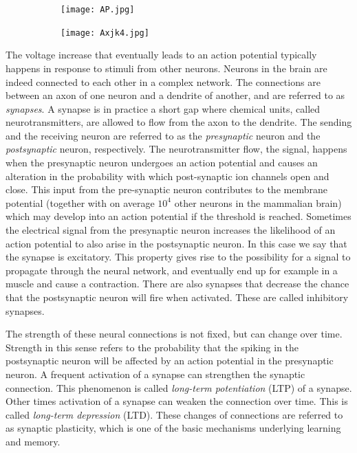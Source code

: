 \begin{figure}[h]
\caption{Graphical representation of an action potential (left). Illustration of action potential propagating along axon (right).}
\label{AP}
\begin{subfigure}
\centering
\texttt{[image: AP.jpg]}
\end{subfigure}
\begin{subfigure}
\centering
\texttt{[image: Axjk4.jpg]}
\end{subfigure}
\end{figure} 

The voltage increase that eventually leads to an action potential typically happens in response to stimuli from other neurons. Neurons in the brain are indeed connected to each other in a complex network. The connections are between an axon of one neuron and a dendrite of another, and are referred to as \textit{synapses}. A synapse is in practice a short gap where chemical units, called neurotransmitters, are allowed to flow from the axon to the dendrite. The sending and the receiving neuron are referred to as the \textit{presynaptic} neuron and the \textit{postsynaptic} neuron, respectively. The neurotransmitter flow, the signal, happens when the presynaptic neuron undergoes an action potential and causes an alteration in the probability with which post-synaptic ion channels open and close. This input from the pre-synaptic neuron contributes to the membrane potential (together with on average $10^4$ other neurons in the mammalian brain) which  may develop into an action potential if the threshold is reached. Sometimes the electrical signal from the presynaptic neuron increases the likelihood of an action potential to also arise in the postsynaptic neuron. In this case we say that the synapse is excitatory. This property gives rise to the possibility for a signal to propagate through the neural network, and eventually end up for example in a muscle and cause a contraction. There are also synapses that decrease the chance that the postsynaptic neuron will fire when activated. These are called inhibitory synapses.

The strength of these neural connections is not fixed, but can change over time. Strength in this sense refers to the probability that the spiking in the postsynaptic neuron will be affected by an action potential in the presynaptic neuron. A frequent activation of a synapse can strengthen the synaptic connection. This phenomenon is called \textit{long-term potentiation} (LTP) of a synapse. Other times activation of a synapse can weaken the connection over time. This is called \textit{long-term depression} (LTD). These changes of connections are referred to as synaptic plasticity, which is one of the basic mechanisms underlying learning and memory. \\

